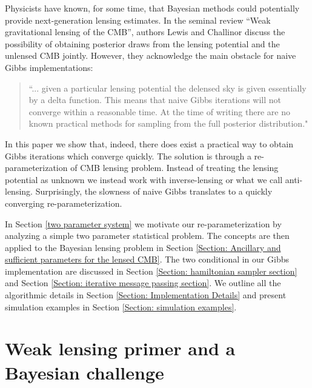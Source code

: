 \documentclass[noinfoline]{imsart}
\begin{document}
Physicists have known, for some time, that Bayesian methods could potentially provide next-generation lensing estimates. In the seminal review ``Weak gravitational lensing of the CMB'', authors Lewis and Challinor \cite{Lewis20061} discuss the possibility of obtaining posterior draws from the lensing potential and the unlensed CMB jointly. However, they acknowledge the main obstacle for naive Gibbs implementations:
\begin{quote}
``... given a particular lensing potential the delensed sky is given essentially by a delta function.
This means that naive Gibbs iterations will not converge within a reasonable time. At the time of writing there are no known practical methods for sampling from the full posterior distribution."
\end{quote}
In this paper we show that, indeed, there does exist a practical way to obtain Gibbs iterations which converge quickly. The solution is through a re-parameterization of CMB lensing problem. Instead of treating the lensing potential as unknown we instead work with inverse-lensing or what we call anti-lensing. Surprisingly, the slowness of naive Gibbs translates to a quickly converging re-parameterization. 



In Section \ref{two parameter system} we motivate our re-parameterization by analyzing a simple two parameter statistical problem.  The concepts are then applied to the Bayesian lensing problem in Section \ref{Section: Ancillary and sufficient parameters for the lensed CMB}. The two conditional in our Gibbs implementation are discussed in Section \ref{Section: hamiltonian sampler section} and Section \ref{Section: iterative message passing section}. We outline all the algorithmic details in Section \ref{Section: Implementation Details} and present simulation examples in Section \ref{Section: simulation examples}.




%
%
\section{Weak lensing primer and a Bayesian challenge}
\label{primer}
\end{document}
